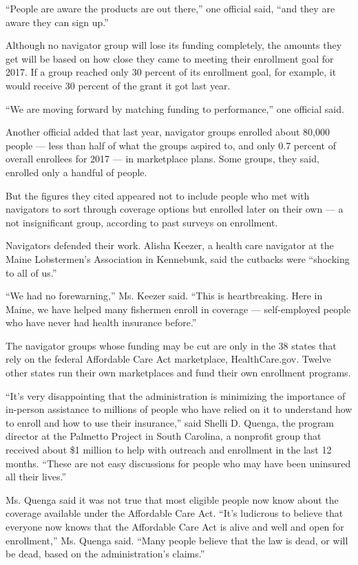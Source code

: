 ``People are aware the products are out there,'' one official said,
``and they are aware they can sign up.''

Although no navigator group will lose its funding completely, the
amounts they get will be based on how close they came to meeting their
enrollment goal for 2017. If a group reached only 30 percent of its
enrollment goal, for example, it would receive 30 percent of the grant
it got last year.

``We are moving forward by matching funding to performance,'' one
official said.

Another official added that last year, navigator groups enrolled about
80,000 people --- less than half of what the groups aspired to, and only
0.7 percent of overall enrollees for 2017 --- in marketplace plans. Some
groups, they said, enrolled only a handful of people.

But the figures they cited appeared not to include people who met with
navigators to sort through coverage options but enrolled later on their
own --- a not insignificant group, according to past surveys on
enrollment.

Navigators defended their work. Alisha Keezer, a health care navigator
at the Maine Lobstermen's Association in Kennebunk, said the cutbacks
were ``shocking to all of us.''

``We had no forewarning,'' Ms. Keezer said. ``This is heartbreaking.
Here in Maine, we have helped many fishermen enroll in coverage ---
self-employed people who have never had health insurance before.''

The navigator groups whose funding may be cut are only in the 38 states
that rely on the federal Affordable Care Act marketplace,
HealthCare.gov. Twelve other states run their own marketplaces and fund
their own enrollment programs.

``It's very disappointing that the administration is minimizing the
importance of in-person assistance to millions of people who have relied
on it to understand how to enroll and how to use their insurance,'' said
Shelli D. Quenga, the program director at the Palmetto Project in South
Carolina, a nonprofit group that received about \$1 million to help with
outreach and enrollment in the last 12 months. ``These are not easy
discussions for people who may have been uninsured all their lives.''

Ms. Quenga said it was not true that most eligible people now know about
the coverage available under the Affordable Care Act. ``It's ludicrous
to believe that everyone now knows that the Affordable Care Act is alive
and well and open for enrollment,'' Ms. Quenga said. ``Many people
believe that the law is dead, or will be dead, based on the
administration's claims.''

